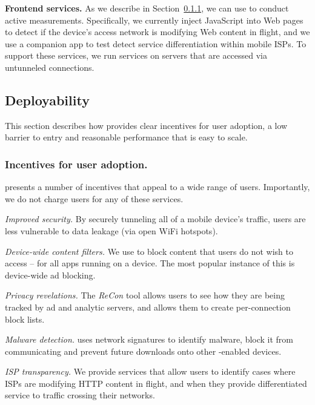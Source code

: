 \noindent\textbf{Frontend services.} As we describe in Section~\ref{}, we can use 
\meddle to conduct active measurements. 
Specifically, we currently inject JavaScript into Web pages to detect if the device's 
access network is modifying Web content in flight, and we use a companion app to 
test detect service differentiation within mobile ISPs. To support these services, we 
run services on \meddle servers that are accessed via untunneled connections. 

\subsection{Deployability}
\label{subsec:design_deploy}

This section describes how \meddle provides clear incentives for user adoption, a 
low barrier to entry and reasonable performance that is easy to scale.

\subsubsection{Incentives for user adoption.} \meddle presents a number of incentives 
that appeal to a wide range of users. Importantly, we do not charge users for any of these 
services.

\begin{packeditemize}
\item \emph{Improved security.} By securely tunneling all of a mobile device's traffic, users 
are less vulnerable to data leakage (\eg via open WiFi hotspots). 
\item \emph{Device-wide content filters.} We use \meddle to block content that users do 
not wish to access -- for all apps running on a device. The most popular instance of this is 
device-wide ad blocking.
\item \emph{Privacy revelations.} The \emph{ReCon} tool allows users to see how they are being 
tracked by ad and analytic servers, and allows them to create per-connection block lists.  
\item \emph{Malware detection.} \meddle uses network signatures to identify malware, block it from 
communicating and prevent future downloads onto other \meddle-enabled devices.  
\item \emph{ISP transparency.} We provide services that allow users to identify cases where 
ISPs are modifying HTTP content in flight, and when they provide differentiated service to 
traffic crossing their networks.
\end{packeditemize}

